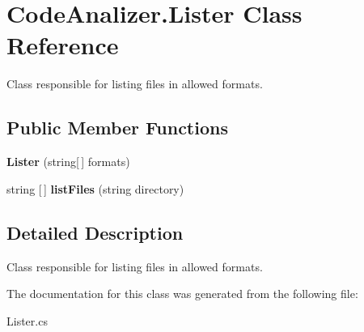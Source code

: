 \hypertarget{class_code_analizer_1_1_lister}{}\section{Code\+Analizer.\+Lister Class Reference}
\label{class_code_analizer_1_1_lister}


Class responsible for listing files in allowed formats.  


\subsection*{Public Member Functions}
\begin{DoxyCompactItemize}
\item 
\mbox{\label{class_code_analizer_1_1_lister_ab3078685b3043561e14a0f7225ecb602}} 
{\bfseries Lister} (string\mbox{[}$\,$\mbox{]} formats)
\item 
\mbox{\label{class_code_analizer_1_1_lister_aea461f2b3410f5763a9b75f531c4582e}} 
string \mbox{[}$\,$\mbox{]} {\bfseries list\+Files} (string directory)
\end{DoxyCompactItemize}


\subsection{Detailed Description}
Class responsible for listing files in allowed formats. 



The documentation for this class was generated from the following file\+:\begin{DoxyCompactItemize}
\item 
Lister.\+cs\end{DoxyCompactItemize}
